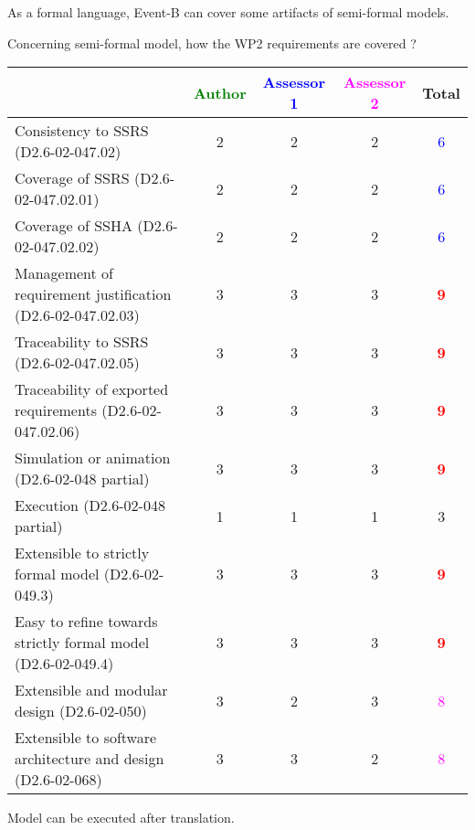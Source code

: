 \begin{author_comment}
As a formal language, Event-B  can cover some artifacts of semi-formal models.
\end{author_comment}

Concerning semi-formal model, how the WP2 requirements are covered ?

\begin{tabular}{|l | c | c | c | c|}
\hline
& \textcolor{green}{Author} & \textcolor{blue}{Assessor 1} & \textcolor{magenta}{Assessor 2} & Total \\
\hline 
Consistency to SSRS (D2.6-02-047.02) & 2     & 2     & 2     & \textcolor{blue}{6} \\
\hline
Coverage of SSRS (D2.6-02-047.02.01)  & 2     & 2     & 2     & \textcolor{blue}{6} \\
\hline
Coverage of SSHA (D2.6-02-047.02.02)  & 2     & 2     & 2     & \textcolor{blue}{6} \\
\hline
Management of requirement justification (D2.6-02-047.02.03)  & 3     & 3     & 3     & \textcolor{red}{\textbf{9}}  \\
\hline
Traceability to  SSRS (D2.6-02-047.02.05)  & 3     & 3     & 3     & \textcolor{red}{\textbf{9}} \\
\hline
Traceability of exported requirements (D2.6-02-047.02.06)  & 3     & 3     & 3     & \textcolor{red}{\textbf{9}} \\
\hline
Simulation or animation (D2.6-02-048 partial)  & 3     & 3     & 3     & \textcolor{red}{\textbf{9}} \\
\hline
Execution (D2.6-02-048 partial)  & 1     & 1     & 1     & 3     \\
\hline
Extensible to strictly formal model (D2.6-02-049.3) & 3     & 3     & 3     &  \textcolor{red}{\textbf{9}} \\
\hline
Easy to  refine towards strictly formal model (D2.6-02-049.4) & 3     & 3     & 3     & \textcolor{red}{\textbf{9}} \\
\hline
Extensible and modular design (D2.6-02-050)  & 3     & 2     & 3     & \textcolor{magenta}{8}  \\
\hline
Extensible to software architecture and design (D2.6-02-068)   & 3     & 3     & 2     & \textcolor{magenta}{8} \\
\hline
\end{tabular}


\begin{author_comment}
Model can be executed after translation.
\end{author_comment}

